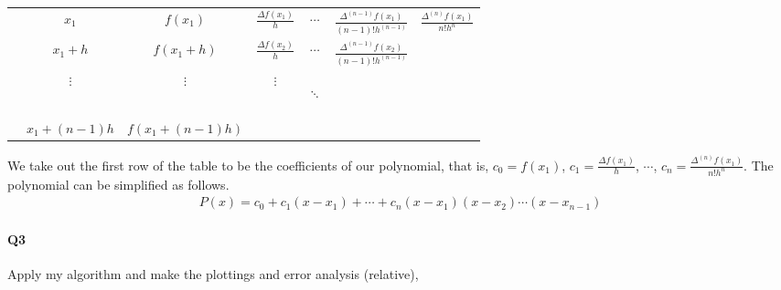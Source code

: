 \documentclass[11pt]{article}
\begin{document}
\begin{center}
\begin{tabular}{ccccccc}
&$x_1$ &$f(x_1)$ &$\frac{\Delta f(x_1)}{h}$ &$\cdots$ 
&$\frac{\Delta ^{(n-1)}f(x_1)}{(n-1)!h^{(n-1)}}$ &$\frac{\Delta ^{(n)}f(x_1)}{n!h^n}$\\

&$x_1+h$ &$f(x_1+h)$ &$\frac{\Delta f(x_2)}{h}$ &$\cdots$ 
&$\frac{\Delta ^{(n-1)}f(x_2)}{(n-1)!h^{(n-1)}}$&\\

&$\vdots$ &$\vdots$ &$\vdots$ &\begin{turn}{90}$\ddots$\end{turn}&&\\
&$x_1+(n-1)h$ &$f(x_1+(n-1)h)$
\end{tabular}
\end{center}
\qquad We take out the first row of the table to be the coefficients of our polynomial, that is, $c_0=f(x_1)$, $c_1=\frac{\Delta f(x_1)}{h}$, $\cdots$, $c_n=\frac{\Delta ^{(n)}f(x_1)}{n!h^n}$. The polynomial can be simplified as follows.
\begin{align}
	P(x)=c_0+c_1(x-x_1)+\cdots+c_n(x-x_1)(x-x_2)\cdots(x-x_{n-1})
\end{align}
\paragraph{Q3}
Apply my algorithm and make the plottings and error analysis (relative),
\begin{figure}[H]
	\centering
\end{figure}
\end{document}
